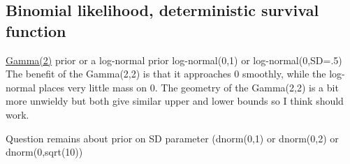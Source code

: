 \documentclass[12pt, oneside, titlepage]{article}   	%
\begin{document}



\subsection*{Binomial likelihood, deterministic survival function}

\href{https://discourse.mc-stan.org/t/funnel-transformed-to-unconstrained-space/8684/6}{Gamma(2)} prior 
or a log-normal prior log-normal(0,1) or log-normal(0,SD=.5) The benefit of the Gamma(2,2) is that it approaches 0 smoothly, while the log-normal places very little mass on 0. The geometry of the Gamma(2,2) is a bit more unwieldy but both give similar upper and lower bounds so I think should work.

Question remains about prior on SD parameter (dnorm(0,1) or dnorm(0,2) or dnorm(0,sqrt(10))
\end{document}
